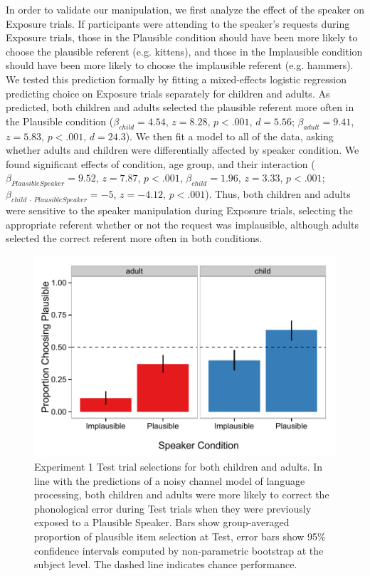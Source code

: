 \documentclass[man,floatsintext]{apa6}
\begin{document}
In order to validate our manipulation, we first analyze the effect of the speaker on Exposure trials. If participants were attending to the speaker's requests during Exposure trials, those in the Plausible condition should have been more likely to choose the plausible referent (e.g. kittens), and those in the Implausible condition should have been more likely to choose the implausible referent (e.g. hammers). We tested this prediction formally by fitting a mixed-effects logistic regression predicting choice on Exposure trials separately for children and adults. As predicted, both children and adults selected the plausible referent more often in the Plausible condition ($\beta_{child} = 4.54$,  $z = 8.28$, $p <.001$, $d = 5.56$; $\beta_{adult} = 9.41$,  $z = 5.83$, $p <.001$, $d = 24.3$). We then fit a model to all of the data, asking whether adults and children were differentially affected by speaker condition. We found significant effects of condition, age group, and their interaction ($\beta_{Plausible Speaker} = 9.52$,  $z = 7.87$, $p <.001$,  $\beta_{child} = 1.96$,  $z = 3.33$, $p <.001$; $\beta_{child\: \cdot \: Plausible Speaker} = -5$,  $z = -4.12$, $p <.001$). Thus, both children and adults were sensitive to the speaker manipulation during Exposure trials, selecting the appropriate referent whether or not the request was implausible, although adults selected the correct referent more often in both conditions.

\begin{figure}[t]
\centering
     \includegraphics[width=5in]{figures/exp1_results.pdf}
    \caption{Experiment 1 Test trial selections for both children and adults. In line with the predictions of a noisy channel model of language processing, both children and adults were more likely to correct the phonological error during Test trials when they were previously exposed to a Plausible Speaker. Bars show group-averaged proportion of plausible item selection at Test, error bars show 95\% confidence intervals computed by non-parametric bootstrap at the subject level. The dashed line indicates chance performance.}%
   \label{fig:exp1_results}
\end{figure}
\end{document}
